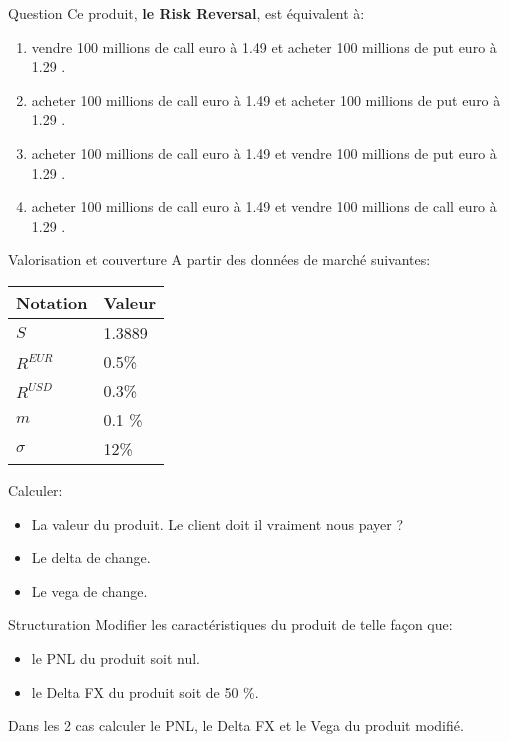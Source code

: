 \documentclass{beamer}
\begin{document}
\begin{frame}{Question}
Ce produit, \textbf{le Risk Reversal}, est équivalent à:\\
\vspace{0.5cm}
\begin{enumerate}
\item vendre 100 millions de call euro à 1.49 et acheter 100 millions de put euro à 1.29 .
\item acheter 100 millions de call euro à 1.49 et acheter 100 millions de put euro à 1.29 .
\item acheter 100 millions de call euro à 1.49 et vendre 100 millions de put euro à 1.29 .
\item acheter 100 millions de call euro à 1.49 et vendre 100 millions de call euro à 1.29 .
\end{enumerate}

\end{frame}

\begin{frame}{Valorisation et couverture}
A partir des données de marché suivantes:\\
\begin{center}
\begin{tabular}{|l|l|}
\hline
\textbf{Notation} & \textbf{Valeur} \\
\hline
\hline
$S$ & 1.3889 \\
$R^{EUR}$ & 0.5\% \\
$R^{USD}$ & 0.3\% \\
$m$ & 0.1 \% \\
$\sigma$ & 12\% \\
\hline
\end{tabular}
\end{center}
Calculer:
\begin{itemize}
\item La valeur du produit. Le client doit il vraiment nous payer ?\\
\item Le delta de change. \\
\item Le vega de change. \\ 
\end{itemize}
\end{frame}

\begin{frame}{Structuration}
Modifier les caractéristiques du produit de telle façon que:\\
\begin{itemize}
\item le PNL du produit soit nul.
\item le Delta FX du produit soit de 50 \%.
\end{itemize}
\vspace{0.5cm}
Dans les 2 cas calculer le PNL, le Delta FX et le Vega du produit modifié.
\end{frame}
\end{document}
